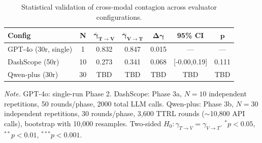 \begin{table}[ht]
\centering
\caption{Statistical validation of cross-modal contagion across evaluator configurations.}
\label{tab:statistical}
\begin{tabular}{lcccccc}
\toprule
\textbf{Config} & \textbf{N} & $\bm{\bar{\gamma}_{T\to V}}$ & $\bm{\bar{\gamma}_{V\to T}}$ & $\bm{\Delta\gamma}$ & \textbf{95\% CI} & $\bm{p}$ \\
\midrule
GPT-4o (30r, single)     & 1    & 0.832  & 0.847  & 0.015  & ---           & --- \\
DashScope (50r)          & 10   & 0.273  & 0.341  & 0.068  & [-0.00,0.19]  & 0.111 \\
Qwen-plus (30r)          & 30   & TBD    & TBD    & TBD    & TBD           & TBD \\
\bottomrule
\end{tabular}

\vspace{4pt}
\begin{minipage}{\textwidth}
\footnotesize
\textit{Note.} GPT-4o: single-run Phase 2. DashScope: Phase 3a, $N=10$ independent repetitions, 50 rounds/phase, 2000 total LLM calls. Qwen-plus: Phase 3b, $N=30$ independent repetitions, 30 rounds/phase, 3,600 TTRL rounds ($\sim$10,800 API calls), bootstrap with 10,000 resamples. Two-sided $H_0: \gamma_{T\to V} = \gamma_{V\to T}$. $^{*}p<0.05$, $^{**}p<0.01$, $^{***}p<0.001$.
\end{minipage}
\end{table}
